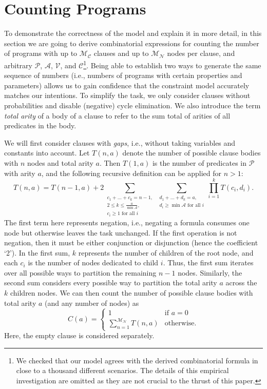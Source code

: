 \documentclass[runningheads]{llncs}
\newcommand{\predicates}{\mathcal{P}}
\newcommand{\variables}{\mathcal{V}}
\newcommand{\constants}{\mathcal{C}}
\newcommand{\arities}{\mathcal{A}}
\newcommand{\maxNumNodes}{\mathcal{M}_{\mathcal{N}}}
\newcommand{\maxNumClauses}{\mathcal{M}_{\mathcal{C}}}
\begin{document}
\section{Counting Programs} \label{sec:counting}

To demonstrate the correctness of the model and explain it in more
detail, in this section we are going to derive combinatorial expressions for
counting the number of programs with up to $\maxNumClauses{}$ clauses and up to
$\maxNumNodes{}$ nodes per clause, and arbitrary $\predicates{}$,
$\arities{}$, $\variables{}$, and $\constants{}$\footnote{We checked that
  our model agrees with the derived combinatorial formula in close to a thousand
  different scenarios. The details of this empirical investigation are omitted
  as they are not crucial to the thrust of this paper.}. Being able to establish
two ways to generate the same sequence of numbers (i.e., numbers of programs
with certain properties and parameters) allows us to gain confidence that the
constraint model accurately matches our intentions. To simplify the task, we
only consider clauses without probabilities and disable (negative) cycle
elimination. We also introduce the term \emph{total arity} of a body of a clause
to refer to the sum total of arities of all predicates in the body.

We will first consider clauses with \emph{gaps}, i.e., without taking variables
and constants into account. Let $T(n, a)$ denote the number of possible clause
bodies with $n$ nodes and total arity $a$. Then $T(1, a)$ is the number of
predicates in $\predicates{}$ with arity $a$, and the following recursive
definition can be applied for $n > 1$:
\[
  T(n, a) = T(n-1, a) + 2\sum_{\substack{c_1 + \dots + c_k = n - 1,\\ 2 \le k
      \le \frac{a}{\min \arities{}},\\ c_i \ge 1 \text{ for all } i}}
  \sum_{\substack{d_1 + \dots + d_k = a,\\ d_i \ge \min \arities{} \text{ for
        all } i}} \prod_{i=1}^k T(c_i, d_i).
\]
The first term here represents negation, i.e., negating a formula consumes
one node but otherwise leaves the task unchanged. If the first operation is not
negation, then it must be either conjunction or disjunction (hence the
coefficient `2'). In the first sum, $k$ represents the number of children of the
root node, and each $c_i$ is the number of nodes dedicated to child $i$. Thus,
the first sum iterates over all possible ways to partition the remaining $n-1$
nodes. Similarly, the second sum considers every possible way to partition the
total arity $a$ across the $k$ children nodes. We can then count the number of
possible clause bodies with total arity $a$ (and any number of nodes) as
\[
  C(a) = \begin{cases}
    1 & \text{if } a = 0\\
    \sum_{n=1}^{\maxNumNodes{}} T(n, a) & \text{otherwise.}
  \end{cases}
\]
Here, the empty clause is considered separately.
\end{document}
